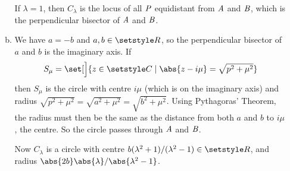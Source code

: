 \documentclass[fleqn,a4paper,11pt]{article}
\begin{document}
\begin{enumerate}
\begin{enumerate}[(a)]
      If \(\lambda = 1\), then \(C_\lambda\) is the locus of all \(\mathit{P}\)
      equidistant from \(\mathit{A}\) and \(\mathit{B}\), which is the perpendicular
      bisector of \(\mathit{A}\) and \(\mathit{B}\).
     \item
      We have \(a = -b\) and \(a, b \in \Reals\), so the perpendicular bisector
      of \(a\) and \(b\) is the imaginary axis. If
      \begin{equation*}
       S_\mu = \set[\Big]{z \in \Complex \mid
                          \abs{z - i\mu} = \textstyle\sqrt{p^2 + \mu^2}}
      \end{equation*}
      then \(S_\mu\) is the circle with centre \(i\mu\) (which is on the
      imaginary axis) and radius
      \(\sqrt{p^2 + \mu^2} = \sqrt{a^2 + \mu^2} = \sqrt{b^2 + \mu^2}\). Using
      Pythagoras' Theorem, the radius must then be the same as the distance from
      both \(a\) and \(b\) to \(i\mu\), the centre. So the circle passes through
      \(\mathit{A}\) and \(\mathit{B}\).

      Now \(C_\lambda\) is a circle with centre
      \(b(\lambda^2 + 1)/(\lambda^2 - 1) \in \Reals\), and radius
      \(\abs{2b}\abs{\lambda}/\abs{\lambda^2 - 1}\).


\end{enumerate}
\end{enumerate}
\end{document}
